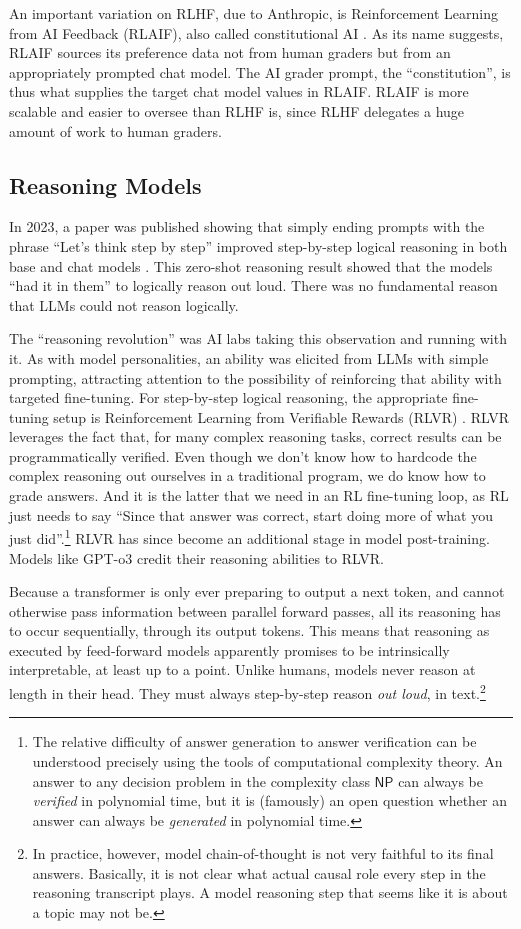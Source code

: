 An important variation on RLHF, due to Anthropic, is Reinforcement Learning
from AI Feedback (RLAIF), also called constitutional AI
\cite{bai2022constitutional}. As its name suggests, RLAIF sources its
preference data not from human graders but from an appropriately prompted chat
model. The AI grader prompt, the ``constitution'', is thus what supplies the
target chat model values in RLAIF. RLAIF is more scalable and easier to oversee
than RLHF is, since RLHF delegates a huge amount of work to human graders.

\subsection{Reasoning Models}
In 2023, a paper was published showing that simply ending prompts with the
phrase ``Let's think step by step'' improved step-by-step logical reasoning in
both base and chat models \cite{kojima2023zeroshot}. This zero-shot reasoning
result showed that the models ``had it in them'' to logically reason out loud.
There was no fundamental reason that LLMs could not reason logically.

The ``reasoning revolution'' was AI labs taking this observation and running
with it. As with model personalities, an ability was elicited from LLMs with
simple prompting, attracting attention to the possibility of reinforcing that
ability with targeted fine-tuning. For step-by-step logical reasoning, the
appropriate fine-tuning setup is Reinforcement Learning from Verifiable Rewards
(RLVR) \cite{lambert2025tulu}. RLVR leverages the fact that, for many complex
reasoning tasks, correct results can be programmatically verified. Even though
we don't know how to hardcode the complex reasoning out ourselves in a
traditional program, we do know how to grade answers. And it is the latter that
we need in an RL fine-tuning loop, as RL just needs to say ``Since that answer
was correct, start doing more of what you just did''.\footnote{The relative
difficulty of answer generation to answer verification can be understood
precisely using the tools of computational complexity theory. An answer to any
decision problem in the complexity class $\mathsf{NP}$ can always be
\emph{verified} in polynomial time, but it is (famously) an open question
whether an answer can always be \emph{generated} in polynomial time.} RLVR has
since become an additional stage in model post-training. Models like GPT-o3
credit their reasoning abilities to RLVR.

Because a transformer is only ever preparing to output a next token, and cannot
otherwise pass information between parallel forward passes, all its reasoning
has to occur sequentially, through its output tokens. This means that reasoning
as executed by feed-forward models apparently promises to be intrinsically
interpretable, at least up to a point. Unlike humans, models never reason at
length in their head. They must always step-by-step reason \emph{out loud}, in
text.\footnote{In practice, however, model chain-of-thought is not very
faithful to its final answers. Basically, it is not clear what actual causal
role every step in the reasoning transcript plays. A model reasoning step that
seems like it is about a topic may not be.}

